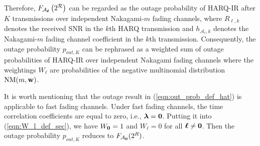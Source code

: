 \documentclass[12pt,onecolumn,draftcls]{IEEEtran}
\newcommand{\bs}{\boldsymbol}
\newtheorem{remark}{Remark}
\begin{document}
Therefore, ${F_{{{ {\cal A}}_{\bs{\ell}}}}}\left( 2^{\mathcal R} \right)$ can be regarded as the outage probability of HARQ-IR after $K$ transmissions over independent Nakagami-$m$ fading channels, where $R_{{\bs{\ell}},k}$ denotes the received SNR in the $k$th HARQ transmission and ${{h_{{{\mathcal A}_{\bs{\ell}}},k}}}$ denotes the Nakagami-$m$ fading channel coefficient in the $k$th transmission. Consequently, the outage probability ${p_{out,K}}$ can be rephrased as a weighted sum of outage probabilities of HARQ-IR over independent Nakagami fading channels where the weightings ${W_{\bs{\ell}}}$ are probabilities of the negative multinomial distribution ${\rm NM}(m,\bf w)$.

It is worth mentioning that the outage result in (\ref{eqn:out_prob_def_hat}) is applicable to fast fading channels. Under fast fading channels, the time correlation coefficients are equal to zero,  i.e., $\bs \lambda =\bf 0$. Putting it into (\ref{eqn:W_l_def_sec}), we have $W_{\bf{0}} = 1$ and $W_{\bs{\ell}} = 0$ for all ${\bs{\ell}} \ne {\bf 0}$. Then the outage probability ${p_{out,K}}$ reduces to ${F_{{{\mathcal A}_{\bf 0}}}}({2^R})$.
\end{document}
